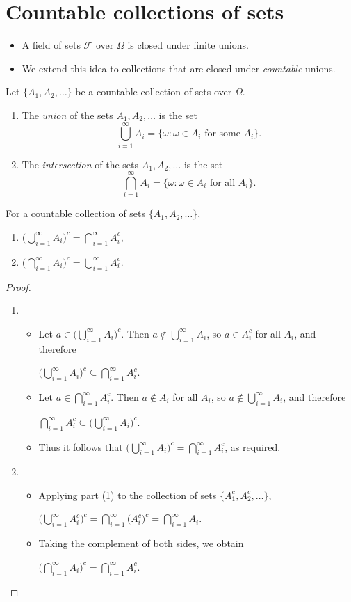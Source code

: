 \documentclass[lecture]{csm}
\def\it{\item}
\def\bit{\begin{itemize}}
\def\eit{\end{itemize}}
\def\ben{\begin{enumerate}}
\def\een{\end{enumerate}}
\begin{document}
\newpage
\section{Countable collections of sets}

\bit
\it A field of sets $\mathcal{F}$ over $\Omega$ is closed under finite unions. 
\it We extend this idea to collections that are closed under \emph{countable} unions.
\eit

\begin{definition}
Let $\{A_1,A_2,\ldots\}$ be a countable collection of sets over $\Omega$.
\ben
\it The \emph{union} of the sets $A_1,A_2,\ldots$ is the set
\[
\bigcup_{i=1}^\infty A_i = \{\omega:\omega\in A_i \text{ for some }A_i\}.
\]
\it The \emph{intersection} of the sets $A_1,A_2,\ldots$  is the set
\[
\displaystyle\bigcap_{i=1}^\infty A_i = \{\omega:\omega\in A_i \text{ for all } A_i\}.
\]
\een
\end{definition}

\break %

\begin{theorem}
For a countable collection of sets $\{A_1,A_2,\ldots\}$,
\ben
\it $\big(\bigcup_{i=1}^{\infty} A_i\big)^c = \bigcap_{i=1}^{\infty} A_i^c$,
\it $\big(\bigcap_{i=1}^{\infty} A_i\big)^c = \bigcup_{i=1}^{\infty} A_i^c$.
\een
\end{theorem}

\begin{proof}
\ben
\it 	\bit
	\it Let $a\in\big(\bigcup_{i=1}^\infty A_i\big)^c$. Then $a\notin\bigcup_{i=1}^\infty A_i$, so $a\in A_i^c$ for all $A_i$, and therefore
		\par $\big(\bigcup_{i=1}^\infty A_i\big)^c \subseteq \bigcap_{i=1}^\infty A_i^c$. 
	\it Let $a\in\bigcap_{i=1}^\infty A_i^c$. Then $a\notin A_i$ for all $A_i$, so $a\notin\bigcup_{i=1}^\infty A_i$, and therefore
		\par $\bigcap_{i=1}^\infty A_i^c \subseteq \big(\bigcup_{i=1}^\infty A_i\big)^c$.
	\it Thus it follows that $\big(\bigcup_{i=1}^{\infty} A_i\big)^c = \bigcap_{i=1}^{\infty} A_i^c$, as required.
	\eit
\it \bit
	\it Applying part (1) to the collection of sets $\{A_1^c,A_2^c,\ldots\}$, 
		\par $\big(\bigcup_{i=1}^\infty A_i^c\big)^c = \bigcap_{i=1}^\infty \big(A_i^c\big)^c = \bigcap_{i=1}^\infty A_i$.
	\it Taking the complement of both sides, we obtain
	 	\par $\big(\bigcap_{i=1}^\infty A_i\big)^c = \bigcap_{i=1}^\infty A_i^c$.
	\eit
\een
\end{proof}
\end{document}
